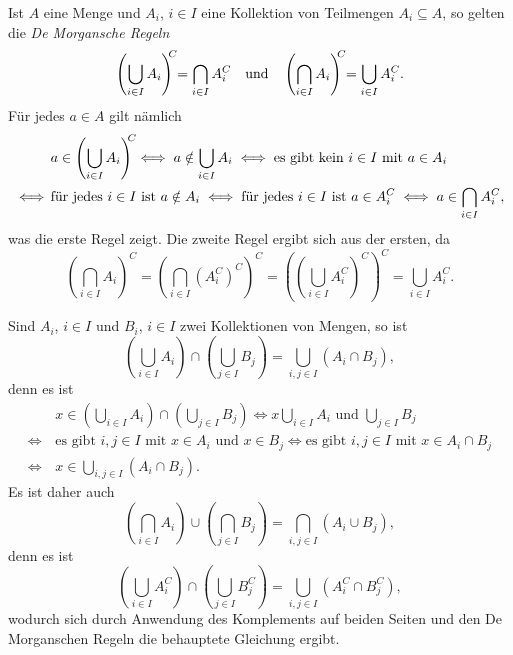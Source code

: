 \begin{bem}
 Ist $A$ eine Menge und $A_i$, $i \in I$ eine Kollektion von Teilmengen $A_i \subseteq A$, so gelten die \emph{De Morgansche Regeln}
 \[
  \left( \bigcup_{i \in I} A_i \right)^{\mathclap{C}} = \bigcap_{i \in I} A_i^C
  \quad\text{und}\quad
  \left( \bigcap_{i \in I} A_i \right)^{\mathclap{C}} = \bigcup_{i \in I} A_i^C.
 \]
 Für jedes $a \in A$ gilt nämlich
 \begin{align*}
      &\, a \in \left( \bigcup_{i \in I} A_i \right)^{\mathclap{C}}
  \iff    a \notin \bigcup_{i \in I} A_i
  \iff    \text{es gibt kein $i \in I$ mit $a \in A_i$} \\
  \iff&\, \text{für jedes $i \in I$ ist $a \notin A_i$}
  \iff    \text{für jedes $i \in I$ ist $a \in A_i^C$}
  \iff    a \in \bigcap_{i \in I} A_i^C,
 \end{align*}
 was die erste Regel zeigt. Die zweite Regel ergibt sich aus der ersten, da
 \[
  \left( \bigcap_{i \in I} A_i \right)^C
  = \left( \bigcap_{i \in I} (A_i^C)^C \right)^C
  = \left( \left( \bigcup_{i \in I} A_i^C \right)^C \right)^C
  = \bigcup_{i \in I} A_i^C.
 \]
\end{bem}


\begin{bem}
 Sind $A_i$, $i \in I$ und $B_i$, $i \in I$ zwei Kollektionen von Mengen, so ist
 \[
  \left( \bigcup_{i \in I} A_i \right) \cap \left( \bigcup_{j \in I} B_j \right)
  = \bigcup_{i,j \in I} (A_i \cap B_j),
 \]
 denn es ist
 \begin{align*}
      &\, x \in \left( \bigcup_{i \in I} A_i \right) \cap \left( \bigcup_{j \in I} B_j \right)
  \iff    \text{$x \bigcup_{i \in I} A_i$ und $\bigcup_{j \in I} B_j$} \\
  \iff&\, \text{es gibt $i,j \in I$ mit $x \in A_i$ und $x \in B_j$} 
  \iff    \text{es gibt $i,j \in I$ mit $x \in A_i \cap B_j$} \\
  \iff&\, x \in \bigcup_{i,j \in I} (A_i \cap B_j).
 \end{align*}
 Es ist daher auch
 \[
  \left( \bigcap_{i \in I} A_i \right) \cup \left( \bigcap_{j \in I} B_j \right)
  = \bigcap_{i,j \in I} (A_i \cup B_j),
 \]
 denn es ist
 \[
  \left( \bigcup_{i \in I} A_i^C \right) \cap \left( \bigcup_{j \in I} B_j^C \right)
  = \bigcup_{i,j \in I} (A_i^C \cap B_j^C),
 \]
 wodurch sich durch Anwendung des Komplements auf beiden Seiten und den De Morganschen Regeln die behauptete Gleichung ergibt.
\end{bem}




